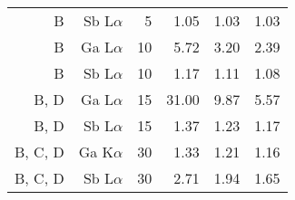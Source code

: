 \begin{table}[phtb]
\begin{center}
\begin{tabular}{rrrrrr}
            B               & Sb L$\alpha$  & 5              & 1.05           & 1.03           & 1.03           \\
            B               & Ga L$\alpha$  & 10             & 5.72           & 3.20           & 2.39           \\
            B               & Sb L$\alpha$  & 10             & 1.17           & 1.11           & 1.08           \\
            B, D            & Ga L$\alpha$  & 15             & 31.00          & 9.87           & 5.57           \\
            B, D            & Sb L$\alpha$  & 15             & 1.37           & 1.23           & 1.17           \\
            B, C, D         & Ga K$\alpha$  & 30             & 1.33           & 1.21           & 1.16           \\
            B, C, D         & Sb L$\alpha$  & 30             & 2.71           & 1.94           & 1.65           \\
            \hline
        \end{tabular}
    \end{center}
\end{table}
